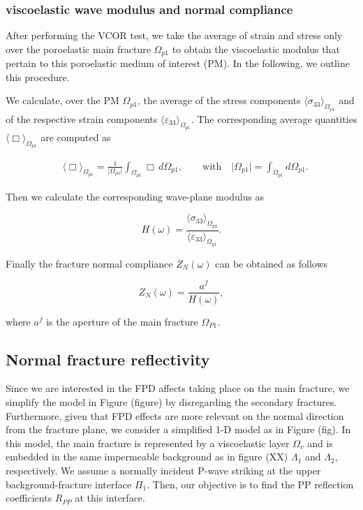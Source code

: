 \documentclass[draft]{agujournal2019}
\begin{document}
\subsubsection{viscoelastic wave modulus and normal  compliance}
After performing the VCOR test, we take the average of strain and stress  only over the poroelastic main fracture $\Omega_{p1}$ to obtain the viscoelastic modulus that pertain to this poroelastic medium of interest (PM). In the following, we outline this procedure.

We calculate, over the PM $\Omega_{p1}$, the average  of the stress components $\langle \sigma_{33} \rangle_{\Omega_{p1}}$ and of the respective strain components $\langle \varepsilon_{33} \rangle_{\Omega_{p1}}$. The corresponding average quantities $\langle \Box \rangle_{\Omega_{p1}}$ are computed as
\begin{linenomath*}
\begin{equation}\label{Eq.12}
\begin{split}
&\langle \Box \rangle_{\Omega_{p1}} = \frac{1}{\vert \Omega_{p1} \vert} \int_{\Omega_{p1}} \Box \, d\Omega_{p1}, \qquad \text{with} \quad  \vert \Omega_{p1} \vert = \int_{\Omega_{p1}}  d\Omega_{p1}.
\end{split}
\end{equation}
\end{linenomath*}

Then we calculate the corresponding wave-plane modulus as
\begin{linenomath*}
\begin{equation}\label{Eq.12}
H(\omega)= \frac{\langle \sigma_{33} \rangle_{\Omega_{p1}}}{\langle \varepsilon_{33} \rangle_{\Omega_{p1}}}.
\end{equation}
\end{linenomath*} 

Finally the fracture normal compliance $Z_N (\omega) $ can be obtained as follows
\begin{linenomath*}
\begin{equation}\label{Eq.12}
Z_N(\omega)= \frac{a^f}{H(\omega)}, 
\end{equation}
\end{linenomath*} 
where $a^f$ is the aperture of the main fracture $\Omega_{P1}$.

\subsection {Normal fracture reflectivity}
Since  we are interested in the FPD affects taking place on  the main fracture,  we simplify the model in Figure (figure) by disregarding  the secondary fractures. Furthermore, given that FPD effects are more relevant on the normal direction from the fracture plane,
we consider a simplified 1-D model as in Figure (fig). In this model, the main fracture is represented by a viscoelastic layer $\Omega_v$ and is embedded in the same impermeable background  as in figure (XX)  $\Lambda_1$ and $\Lambda_2$, respectively.
We assume a normally incident P-wave striking at the upper background-fracture interface $\Pi_1$. 
Then, 
our objective is to find the PP reflection coefficients $R_{PP}$ at this interface.
\end{document}
